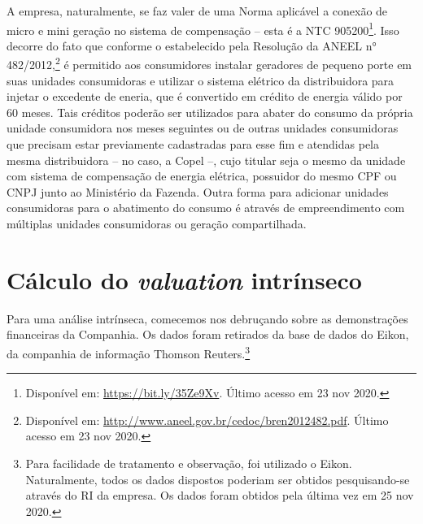 \documentclass[grad,numbers]{coppe}
\begin{document}
  A empresa, naturalmente, se faz valer de uma Norma aplicável a conexão de micro e mini geração no sistema de compensação -- esta é a NTC 905200\footnote{Disponível em: \url{https://bit.ly/35Ze9Xv}. Último acesso em 23 nov 2020.}. Isso decorre do fato que conforme o estabelecido pela Resolução da ANEEL n° 482/2012,\footnote{Disponível em: \url{http://www.aneel.gov.br/cedoc/bren2012482.pdf}. Último acesso em 23 nov 2020.} é permitido aos consumidores instalar geradores de pequeno porte em suas unidades consumidoras e utilizar o sistema elétrico da distribuidora para injetar o excedente de eneria, que é convertido em crédito de energia válido por 60 meses. Tais créditos poderão ser utilizados para abater do consumo da própria unidade consumidora nos meses seguintes ou de outras unidades consumidoras que precisam estar previamente cadastradas para esse fim e atendidas pela mesma distribuidora -- no caso, a Copel --, cujo titular seja o mesmo da unidade com sistema de compensação de energia elétrica, possuidor do mesmo CPF ou CNPJ junto ao Ministério da Fazenda. Outra forma para adicionar unidades consumidoras para o abatimento do consumo é através de empreendimento com múltiplas unidades consumidoras ou geração compartilhada.

  \hypertarget{cuxe1lculo-do-valuation-intruxednseco}{%
  \section{\texorpdfstring{Cálculo do \emph{valuation} intrínseco}{Cálculo do valuation intrínseco}}\label{cuxe1lculo-do-valuation-intruxednseco}}

  Para uma análise intrínseca, comecemos nos debruçando sobre as demonstrações financeiras da Companhia. Os dados foram retirados da base de dados do Eikon, da companhia de informação Thomson Reuters.\footnote{Para facilidade de tratamento e observação, foi utilizado o Eikon. Naturalmente, todos os dados dispostos poderiam ser obtidos pesquisando-se através do RI da empresa. Os dados foram obtidos pela última vez em 25 nov 2020.}
\end{document}
